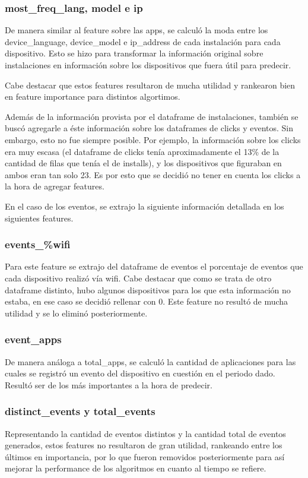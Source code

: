 \documentclass[a4paper, 12pt]{article}
\begin{document}
\subsubsection*{most\_freq\_lang, model e ip}
De manera similar al feature sobre las apps, se calculó la moda entre los device\_language, device\_model e ip\_address de cada instalación para cada dispositivo. Esto se hizo para transformar la información original sobre instalaciones en información sobre los dispositivos que fuera útil para predecir. 

Cabe destacar que estos features resultaron de mucha utilidad y rankearon bien en feature importance para distintos algortimos.

Además de la información provista por el dataframe de instalaciones, también se buscó agregarle a éste información sobre los dataframes de clicks y eventos. Sin embargo, esto no fue siempre posible.
Por ejemplo, la información sobre los clicks era muy escasa (el dataframe de clicks tenía aproximadamente el 13\% de la cantidad de filas que tenía el de installs), y los dispositivos que figuraban en ambos eran tan solo 23. Es por esto que se decidió no tener en cuenta los clicks a la hora de agregar features.

En el caso de los eventos, se extrajo la siguiente información detallada en los siguientes features.

\subsubsection*{events\_\%wifi}
Para este feature se extrajo del dataframe de eventos el porcentaje de eventos que cada dispositivo realizó vía wifi. Cabe destacar que como se trata de otro dataframe distinto, hubo algunos dispositivos para los que esta información no estaba, en ese caso se decidió rellenar con 0. Este feature no resultó de mucha utilidad y se lo eliminó posteriormente.

\subsubsection*{event\_apps}
De manera análoga a total\_apps, se calculó la cantidad de aplicaciones para las cuales se registró un evento del dispositivo en cuestión en el periodo dado. Resultó ser de los más importantes a la hora de predecir.

\subsubsection*{distinct\_events y total\_events}
Representando la cantidad de eventos distintos y la cantidad total de eventos generados, estos features no resultaron de gran utilidad, rankeando entre los últimos en importancia, por lo que fueron removidos posteriormente para así mejorar la performance de los algoritmos en cuanto al tiempo se refiere.
\end{document}
